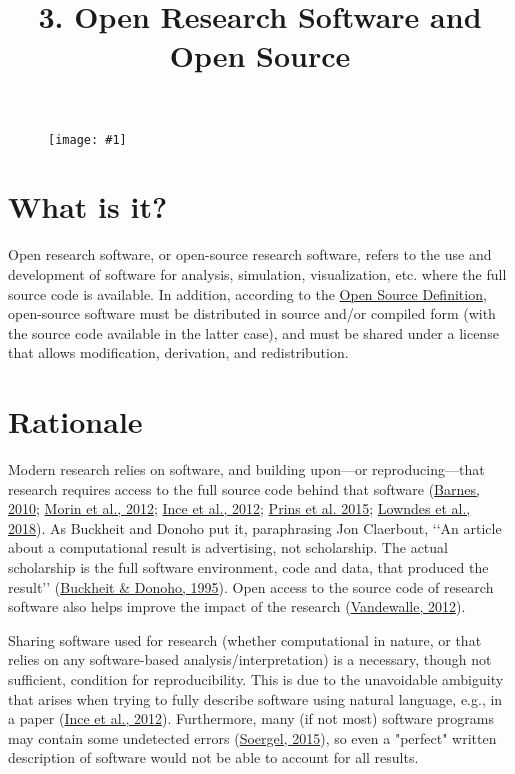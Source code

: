 \documentclass{article}
\newlength{\imgwidth}
\newcommand\scaledgraphics[2]{%
                
\settowidth{\imgwidth}{\texttt{[image: \#1]}}%
                
\setlength{\imgwidth}{\minof{\imgwidth}{#2\textwidth}}%
                
\texttt{[image: \#1]}%
                
}
\begin{document}
\title{3. Open Research Software and Open Source}

\maketitle

\begin{figure}
\scaledgraphics{7ed44872-310b-4a80-bd1a-0dcd10436d5f.png}{1}
\label{F32498651}
\end{figure}


\section{What is it?}\label{H7338861}



Open research software, or open-source research software, refers to the use and development of software for analysis, simulation, visualization, etc. where the full source code is available. In addition, according to the \href{https://opensource.org/osd}{Open Source Definition}, open-source software must be distributed in source and/or compiled form (with the source code available in the latter case), and must be shared under a license that allows modification, derivation, and redistribution.


\section{Rationale}\label{rationale}



Modern research relies on software, and building upon—or reproducing—that research requires access to the full source code behind that software (\href{https://doi.org/10/cj8t6n}{Barnes, 2010}; \href{https://doi.org/10/m5t}{Morin et al., 2012}; \href{https://doi.org/10/hqg}{Ince et al., 2012}; \href{https://doi.org/10/f3mn4p}{Prins et al. 2015}; \href{https://doi.org/10/gc4jb3}{Lowndes et al., 2018}). As Buckheit and Donoho put it, paraphrasing Jon Claerbout, ‘‘An article about a computational result is advertising, not scholarship. The actual scholarship is the full software environment, code and data, that produced the result’’ (\href{https://doi.org/10.1007/978-1-4612-2544-7_5}{Buckheit \& Donoho, 1995}). Open access to the source code of research software also helps improve the impact of the research (\href{https://doi.org/10/gc5sjp}{Vandewalle, 2012}).


Sharing software used for research (whether computational in nature, or that relies on any software-based analysis/interpretation) is a necessary, though not sufficient, condition for reproducibility. This is due to the unavoidable ambiguity that arises when trying to fully describe software using natural language, e.g., in a paper (\href{https://doi.org/10/hqg}{Ince et al., 2012}). Furthermore, many (if not most) software programs may contain some undetected errors (\href{https://doi.org/10/gc5sjg}{Soergel, 2015}), so even a "perfect" written description of software would not be able to account for all results.
\end{document}
